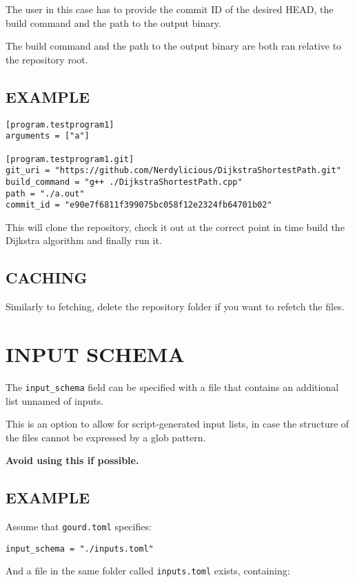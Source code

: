 \documentclass[a4paper,english]{article}
\begin{document}
\begin{adjustwidth}{18pt}{0pt}
        The user in this case has to provide the commit ID of the desired HEAD,
        the build command and the path to the output binary.

        The build command and the path to the output binary are both ran relative
        to the repository root.

        \subsection{EXAMPLE}

            \begin{verbatim}
[program.testprogram1]
arguments = ["a"]

[program.testprogram1.git]
git_uri = "https://github.com/Nerdylicious/DijkstraShortestPath.git"
build_command = "g++ ./DijkstraShortestPath.cpp"
path = "./a.out"
commit_id = "e90e7f6811f399075bc058f12e2324fb64701b02"
            \end{verbatim}
            This will clone the repository, check it out at the correct point in time
            build the Dijkstra algorithm and finally run it.

        \subsection{CACHING}

            Similarly to fetching, delete the repository folder if you want to refetch the files.

    \section{INPUT SCHEMA}

        The \texttt{input\_schema} field can be specified with a file that contains
        an additional list unnamed of inputs.

        This is an option to allow for script-generated input lists, in case
        the structure of the files cannot be expressed by a glob pattern.

        \textbf{Avoid using this if possible.}


        \subsection{EXAMPLE}

            Assume that \texttt{gourd.toml} specifies:

            \begin{verbatim}
input_schema = "./inputs.toml"
            \end{verbatim}
            And a file in the same folder called \texttt{inputs.toml}
            exists, containing:


\end{adjustwidth}
\end{document}
